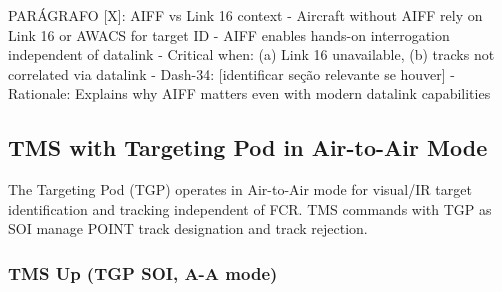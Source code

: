 \documentclass[11pt, a4paper, twoside]{report}
\newcommand{\dashref}[1]{Dash-34~\S~#1}
\begin{document}

PARÁGRAFO [X]: AIFF vs Link 16 context
- Aircraft without AIFF rely on Link 16 or AWACS for target ID
- AIFF enables hands-on interrogation independent of datalink
- Critical when: (a) Link 16 unavailable, (b) tracks not correlated via datalink
- Dash-34: [identificar seção relevante se houver]
- Rationale: Explains why AIFF matters even with modern datalink capabilities

\subsection{TMS with Targeting Pod in Air-to-Air Mode}
\label{sec:C4-S3-S6}

The Targeting Pod (TGP) operates in Air-to-Air mode for visual/IR target 
identification and tracking independent of FCR. TMS commands with TGP as 
SOI manage POINT track designation and track rejection.

\subsubsection*{TMS Up (TGP SOI, A-A mode)}
\label{sec:C4-S3-S6-S1}
\end{document}
